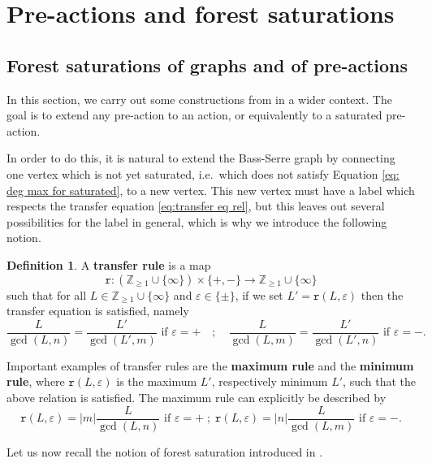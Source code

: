 \documentclass[12pt]{article}
\numberwithin{equation}{section}
\theoremstyle{definition}
\newtheorem{definition}[equation]{Definition}
\def\defin#1{\textbf{#1}}
\newcommand{\Z}{\mathbb{Z}}
\newcommand{\abs}[1]{\left\lvert #1\right\rvert}
\newcommand{\trrule}{\mathtt{r}}
\begin{document}
\section{Pre-actions and forest saturations} \label{Sect: forest saturations}

\subsection{Forest saturations of graphs and of pre-actions}\label{Sect: forest sat construction}
	In this section, we carry out some constructions from \cite{CGLMS-22}
	in a wider context. 
	The goal is to extend any pre-action to an action, or equivalently to a saturated pre-action. 

	In order to do this, it is natural to extend the Bass-Serre graph
	by connecting one vertex which is not yet saturated, i.e.~which does not satisfy 
	Equation \eqref{eq: deg max for saturated}, to a new
	vertex.
	This new vertex must have a label which respects the transfer equation 
	\eqref{eq:transfer eq rel}, but this leaves out several
	possibilities for the label in general, which is why we introduce the following notion.

	\begin{definition}
	    A \textbf{transfer rule} is a map 
	    \[
	        \trrule: (\Z_{\geq 1}\cup\{\infty\})\times \{+,-\}\longrightarrow \Z_{\geq 1}\cup\{\infty\}
        \]
	    such that for all \(L\in \Z_{\geq 1}\cup\{\infty\}\) and \(\varepsilon\in\{\pm\}\), 
		if we set \(L'=\trrule(L,\varepsilon)\)
	    then the transfer equation is satisfied, namely
	    \[
			\frac{L}{\gcd(L,n)} = \frac{L'}{\gcd(L',m)} \text{ if } \varepsilon = +
			\quad ; \quad
			\frac{L}{\gcd(L,m)} = \frac{L'}{\gcd(L',n)} \text{ if } \varepsilon = - .
		\]
	\end{definition}
	
	Important examples of transfer rules are the \defin{maximum rule} and the \defin{minimum rule}, 
	where \( \trrule(L,\varepsilon) \) is the maximum \( L' \), respectively minimum \( L' \), 
	such that the above relation is satisfied.
	The maximum rule can explicitly be described by
	\begin{equation}\label{eq: max rule}
\trrule(L,\varepsilon) = \abs{m}\frac{L}{\gcd(L,n)} \text{ if } \varepsilon = +
			\; ; \;
			\trrule(L,\varepsilon) = \abs{n}\frac{L}{\gcd(L,m)} \text{ if } \varepsilon = - .
	\end{equation}


    Let us now recall the notion of forest saturation introduced in \cite[Definition~4.21]{CGLMS-22}. 
    
\end{document}
